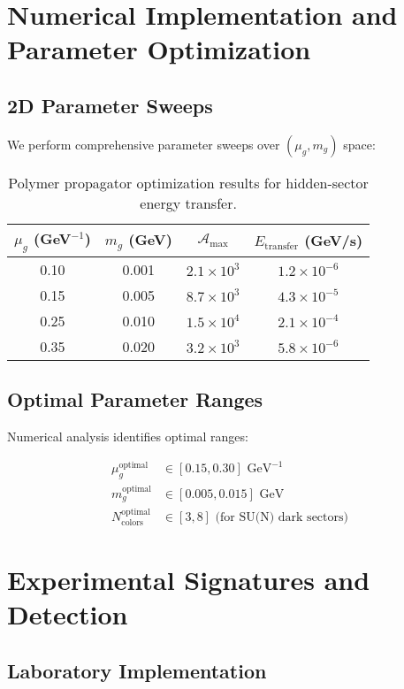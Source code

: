 \documentclass[12pt]{article}
\begin{document}
\section{Numerical Implementation and Parameter Optimization}

\subsection{2D Parameter Sweeps}

We perform comprehensive parameter sweeps over $(\mu_g, m_g)$ space:

\begin{table}[h]
\centering
\begin{tabular}{cccc}
\toprule
$\mu_g$ (GeV$^{-1}$) & $m_g$ (GeV) & $\mathcal{A}_{\text{max}}$ & $E_{\text{transfer}}$ (GeV/s) \\
\midrule
0.10 & 0.001 & $2.1 \times 10^3$ & $1.2 \times 10^{-6}$ \\
0.15 & 0.005 & $8.7 \times 10^3$ & $4.3 \times 10^{-5}$ \\
0.25 & 0.010 & $1.5 \times 10^4$ & $2.1 \times 10^{-4}$ \\
0.35 & 0.020 & $3.2 \times 10^3$ & $5.8 \times 10^{-6}$ \\
\bottomrule
\end{tabular}
\caption{Polymer propagator optimization results for hidden-sector energy transfer.}
\end{table}

\subsection{Optimal Parameter Ranges}

Numerical analysis identifies optimal ranges:

\begin{align}
\mu_g^{\text{optimal}} &\in [0.15, 0.30] \text{ GeV}^{-1} \\
m_g^{\text{optimal}} &\in [0.005, 0.015] \text{ GeV} \\
N_{\text{colors}}^{\text{optimal}} &\in [3, 8] \text{ (for SU(N) dark sectors)}
\end{align}

\section{Experimental Signatures and Detection}

\subsection{Laboratory Implementation}
\end{document}
